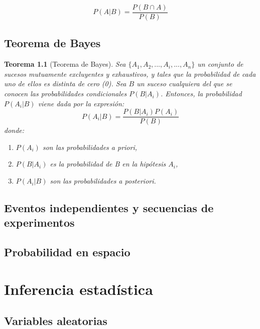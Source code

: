 \documentclass[
  10pt,
]{krantz}
\providecommand{\tightlist}{%
  \setlength{\itemsep}{0pt}\setlength{\parskip}{0pt}}
\newtheorem{theorem}{Teorema}[chapter]
\theoremstyle{definition}
\theoremstyle{definition}
\theoremstyle{definition}
\theoremstyle{definition}
\theoremstyle{remark}
\begin{document}
\[P(A|B)= \frac{P(B\cap A)}{P(B)}\]

\hypertarget{teorema-de-bayes}{%
\chapter{Teorema de Bayes}\label{teorema-de-bayes}}

\begin{theorem}[Teorema de Bayes]
\protect\hypertarget{thm:unnamed-chunk-9}{}{\label{thm:unnamed-chunk-9} {} }Sea \(\{A_{1},A_{2},...,A_{i},...,A_{n}\}\) un conjunto de sucesos mutuamente excluyentes y exhaustivos, y tales que la probabilidad de cada uno de ellos es distinta de cero (0). Sea \(B\) un suceso cualquiera del que se conocen las probabilidades condicionales \(P(B|A_i )\). Entonces, la probabilidad \(P(A_i|B)\) viene dada por la expresión:
\[P(A_i|B)=\frac{P(B|A_i)P(A_i)}{P(B)}\]
donde:

\begin{enumerate}
\def\labelenumi{\arabic{enumi}.}
\tightlist
\item
  \(P(A_i)\) son las probabilidades a priori,
\item
  \(P(B|A_i)\) es la probabilidad de B en la hipótesis \(A_i\),
\item
  \(P(A_i|B)\) son las probabilidades a posteriori.
\end{enumerate}
\end{theorem}

\hypertarget{eventos-independientes-y-secuencias-de-experimentos}{%
\chapter{Eventos independientes y secuencias de experimentos}\label{eventos-independientes-y-secuencias-de-experimentos}}

\hypertarget{probabilidad-en-espacio}{%
\chapter{Probabilidad en espacio}\label{probabilidad-en-espacio}}

\hypertarget{part-inferencia-estaduxedstica}{%
\part{Inferencia estadística}\label{part-inferencia-estaduxedstica}}

\hypertarget{variables-aleatorias}{%
\chapter{Variables aleatorias}\label{variables-aleatorias}}
\end{document}
